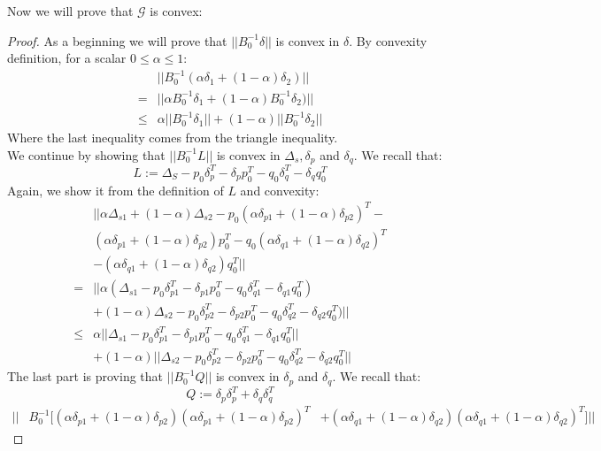 \documentclass[11pt,twocolumn,varwidth=true,a4paper,fleqn]{article}
\begin{document}
Now we will prove that $\mathcal{G}$ is convex:
\begin{proof}
As a beginning we will prove that $||B_0^{-1}\delta||$ is convex in $\delta$.
By convexity definition, for a scalar $0 \leq \alpha \leq 1$: 
\begin{equation} 
\begin{split}
& ||B_0^{-1}(\alpha\delta_1+(1-\alpha)\delta_2)|| \\
= & ||\alpha B_0^{-1}\delta_1+(1-\alpha)B_0^{-1}\delta_2)|| \\
\leq & \alpha||B_0^{-1}\delta_1||+(1-\alpha)||B_0^{-1}\delta_2||
\end{split}
\end{equation}
Where the last inequality comes from the triangle inequality.
\\
We continue by showing that $||B_0^{-1}L||$ is convex in $\Delta_s, \delta_p$
and $\delta_q$. 
We recall that:
\begin{equation*} 
L:= \Delta_S - p_0\delta_p^T - \delta_pp_0^T - q_0\delta_q^T - \delta_qq_0^T
\end{equation*}
Again, we show it from the definition of $L$ and convexity:
\begin{equation*} 
\begin{split}
& ||\alpha\Delta_{s1}+(1-\alpha)\Delta_{s2} -
p_0(\alpha\delta_{p1}+(1-\alpha)\delta_{p2})^T - \\
& (\alpha\delta_{p1}+(1-\alpha)\delta_{p2})p_0^T -
q_0(\alpha\delta_{q1}+(1-\alpha)\delta_{q2})^T \\
& - (\alpha\delta_{q1}+(1-\alpha)\delta_{q2})q_0^T || \\
= & ||\alpha(\Delta_{s1} - p_0\delta_{p1}^T - \delta_{p1}p_0^T -
q_0\delta_{q1}^T - \delta_{q1}q_0^T) \\
& + (1-\alpha)\Delta_{s2} - p_0\delta_{p2}^T - \delta_{p2}p_0^T -
q_0\delta_{q2}^T - \delta_{q2}q_0^T)|| \\
\leq & \alpha||\Delta_{s1} - p_0\delta_{p1}^T - \delta_{p1}p_0^T -
q_0\delta_{q1}^T - \delta_{q1}q_0^T|| \\
& + (1-\alpha)||\Delta_{s2} - p_0\delta_{p2}^T - \delta_{p2}p_0^T -
q_0\delta_{q2}^T - \delta_{q2}q_0^T||
\end{split}
\end{equation*}
The last part is proving that $||B_0^{-1}Q||$ is convex in $\delta_p$
and $\delta_q$. We recall that:
\begin{equation*} 
Q:=\delta_p\delta_p^T + \delta_q\delta_q^T
\end{equation*}
\begin{equation*} 
\begin{split}
|| & B_0^{-1}[(\alpha\delta_{p1}+(1-\alpha)\delta_{p2})(\alpha\delta_{p1}+(1-\alpha)\delta_{p2})^T 
& + (\alpha\delta_{q1}+(1-\alpha)\delta_{q2})(\alpha\delta_{q1}+(1-\alpha)\delta_{q2})^T]||
\end{split}
\end{equation*}
\end{proof}


\end{document}
